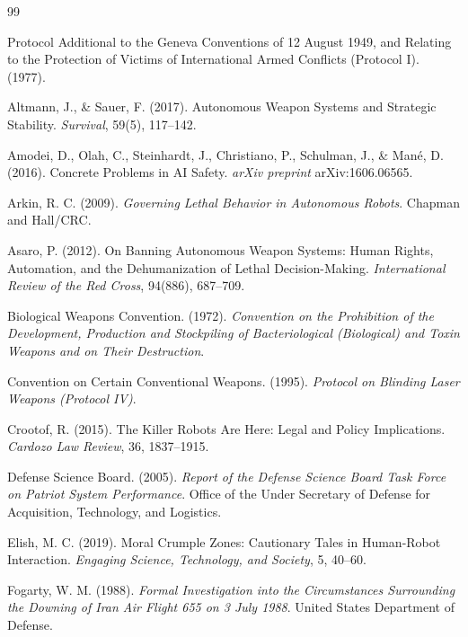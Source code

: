 \documentclass[11pt]{article}
\begin{document}
\begin{thebibliography}{99}
\setlength{\itemsep}{0.25em}

Protocol Additional to the Geneva Conventions of 12 August 1949, and Relating to the Protection of Victims of International Armed Conflicts (Protocol I). (1977).

Altmann, J., \& Sauer, F. (2017). Autonomous Weapon Systems and Strategic Stability. \textit{Survival}, 59(5), 117--142.

Amodei, D., Olah, C., Steinhardt, J., Christiano, P., Schulman, J., \& Man\'{e}, D. (2016). Concrete Problems in AI Safety. \textit{arXiv preprint} arXiv:1606.06565.

Arkin, R. C. (2009). \textit{Governing Lethal Behavior in Autonomous Robots}. Chapman and Hall/CRC.

Asaro, P. (2012). On Banning Autonomous Weapon Systems: Human Rights, Automation, and the Dehumanization of Lethal Decision-Making. \textit{International Review of the Red Cross}, 94(886), 687--709.

Biological Weapons Convention. (1972). \textit{Convention on the Prohibition of the Development, Production and Stockpiling of Bacteriological (Biological) and Toxin Weapons and on Their Destruction}.

Convention on Certain Conventional Weapons. (1995). \textit{Protocol on Blinding Laser Weapons (Protocol IV)}.

Crootof, R. (2015). The Killer Robots Are Here: Legal and Policy Implications. \textit{Cardozo Law Review}, 36, 1837--1915.

Defense Science Board. (2005). \textit{Report of the Defense Science Board Task Force on Patriot System Performance}. Office of the Under Secretary of Defense for Acquisition, Technology, and Logistics.

Elish, M. C. (2019). Moral Crumple Zones: Cautionary Tales in Human-Robot Interaction. \textit{Engaging Science, Technology, and Society}, 5, 40--60.

Fogarty, W. M. (1988). \textit{Formal Investigation into the Circumstances Surrounding the Downing of Iran Air Flight 655 on 3 July 1988}. United States Department of Defense.


\end{thebibliography}
\end{document}
